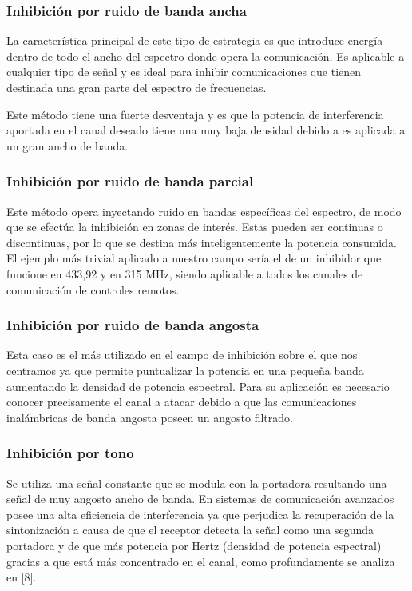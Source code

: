 \subsubsection{Inhibición por ruido de banda ancha}

La característica principal de este tipo de estrategia es que introduce energía dentro de todo el ancho del espectro donde opera la comunicación.
Es aplicable a cualquier tipo de señal y es ideal para inhibir comunicaciones que tienen destinada una gran parte del espectro de frecuencias.\par
Este método tiene una fuerte desventaja y es que la potencia de interferencia aportada en el canal deseado tiene una muy baja densidad debido 
a es aplicada a un gran ancho de banda.

\subsubsection{Inhibición por ruido de banda parcial}

Este método opera inyectando ruido en bandas específicas del espectro, de modo que se efectúa la  inhibición en zonas de interés. Estas pueden ser continuas o discontinuas, por lo que se destina más inteligentemente la potencia consumida. El ejemplo más trivial aplicado a nuestro
campo sería el de un inhibidor que funcione en 433,92 y en 315 MHz, siendo  aplicable a todos los canales de comunicación de controles remotos.

\subsubsection{Inhibición por ruido de banda angosta}

Esta caso es el más utilizado en el campo de inhibición sobre el que nos centramos ya que permite puntualizar la potencia en una pequeña
banda aumentando la densidad de potencia espectral. Para su aplicación es necesario conocer precisamente el canal a atacar debido a que las 
comunicaciones inalámbricas de banda angosta poseen un angosto filtrado.

\subsubsection{Inhibición por tono}

Se utiliza una señal constante que se modula con la portadora resultando una señal de muy angosto ancho de banda. En sistemas de comunicación 
avanzados posee una alta eficiencia de interferencia ya que perjudica la recuperación de la sintonización a causa de que el receptor detecta 
la señal como una segunda portadora y de que más potencia por Hertz (densidad de potencia espectral) gracias a que está más concentrado
en el canal, como profundamente se analiza en [8].

